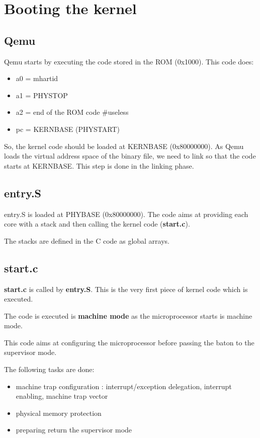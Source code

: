 \documentclass[10pt, a4paper]{article}
\begin{document}
\section{Booting the kernel}
\subsection{Qemu}

Qemu starts by executing the code stored in the ROM (0x1000).
This code does:
\begin{itemize}
\item a0 = mhartid
\item a1 = PHYSTOP
\item a2 = end of the ROM code \#useless
\item pc = KERNBASE (PHYSTART)
\end{itemize}

So, the kernel code should be loaded at KERNBASE (0x80000000). As Qemu loads the virtual address space of the binary file, we need to link so that the code starts at KERNBASE. This step is done in the linking phase.

\subsection{entry.S}

entry.S is loaded at PHYBASE (0x80000000).
The code aims at providing each core with a stack and then calling the kernel code (\textbf{start.c}).

The stacks are defined in the C code as global arrays.

\subsection{start.c}

\textbf{start.c} is called by \textbf{entry.S}. This is the very first piece of kernel code which is executed. 

The code is executed is \textbf{machine mode} as the microprocessor starts is machine mode.

This code aims at configuring the microprocessor before passing the baton to the supervisor mode.

The following tasks are done:
\begin{itemize}
\item machine trap configuration : interrupt/exception delegation, interrupt enabling, machine trap vector
\item physical memory protection
\item preparing return the supervisor mode \label{aa}
\end{itemize}
\end{document}
